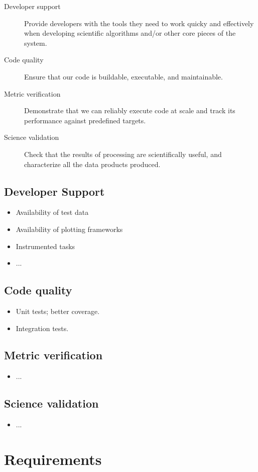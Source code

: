 \documentclass[DM,authoryear,toc,lsstdraft]{lsstdoc}
\begin{document}
\begin{description}

\item[Developer support]{Provide developers with the tools they need to work
quicky and effectively when developing scientific algorithms and/or other core
pieces of the system.}

\item[Code quality]{Ensure that our code is buildable, executable, and
maintainable.}

\item[Metric verification]{Demonstrate that we can reliably execute code at
scale and track its performance against predefined targets.}

\item[Science validation]{Check that the results of processing are
scientifically useful, and characterize all the data products produced.}

\end{description}

\subsection{Developer Support}

\begin{itemize}

\item{Availability of test data}
\item{Availability of plotting frameworks}
\item{Instrumented tasks}
\item{...}

\end{itemize}

\subsection{Code quality}

\begin{itemize}
\item{Unit tests; better coverage.}
\item{Integration tests.}
\end{itemize}

\subsection{Metric verification}

\begin{itemize}
\item{...}
\end{itemize}

\subsection{Science validation}

\begin{itemize}
\item{...}
\end{itemize}

\section{Requirements}
\label{sec:req}



\end{document}
